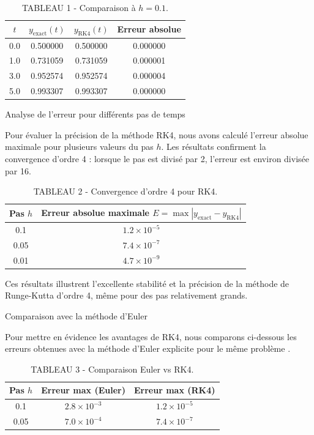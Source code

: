 \documentclass[12pt,a4paper]{article}
\begin{document}
\begin{table}[h]
\centering
\begin{tabular}{cccc}
\toprule
$t$ & $y_{\text{exact}}(t)$ & $y_{\text{RK4}}(t)$ & Erreur absolue \\
\midrule
0.0 & 0.500000 & 0.500000 & 0.000000 \\
1.0 & 0.731059 & 0.731059 & 0.000001 \\
3.0 & 0.952574 & 0.952574 & 0.000004 \\
5.0 & 0.993307 & 0.993307 & 0.000000 \\
\bottomrule
\end{tabular}
\caption{TABLEAU 1 - Comparaison à $h=0.1$.}
\end{table}

\vspace{1em}

Analyse de l’erreur pour différents pas de temps

Pour évaluer la précision de la méthode RK4, nous avons calculé l’erreur absolue maximale pour plusieurs valeurs du pas $h$. Les résultats confirment la convergence d’ordre 4 : lorsque le pas est divisé par 2, l’erreur est environ divisée par 16.

\begin{table}[h]
\centering
\begin{tabular}{cc}
\toprule
Pas $h$ & Erreur absolue maximale $E = \max |y_{\text{exact}} - y_{\text{RK4}}|$ \\
\midrule
0.1 & $1.2 \times 10^{-5}$ \\
0.05 & $7.4 \times 10^{-7}$ \\
0.01 & $4.7 \times 10^{-9}$ \\
\bottomrule
\end{tabular}
\caption{TABLEAU 2 - Convergence d'ordre 4 pour RK4.}
\end{table}

Ces résultats illustrent l’excellente stabilité et la précision de la méthode de Runge-Kutta d’ordre 4, même pour des pas relativement grands.

Comparaison avec la méthode d’Euler

Pour mettre en évidence les avantages de RK4, nous comparons ci-dessous les erreurs obtenues avec la méthode d’Euler explicite pour le même problème \cite{dormand}.

\begin{table}[h]
\centering
\begin{tabular}{ccc}
\toprule
Pas $h$ & Erreur max (Euler) & Erreur max (RK4) \\
\midrule
0.1 & $2.8 \times 10^{-3}$ & $1.2 \times 10^{-5}$ \\
0.05 & $7.0 \times 10^{-4}$ & $7.4 \times 10^{-7}$ \\
\bottomrule
\end{tabular}
\caption{TABLEAU 3 - Comparaison Euler vs RK4.}
\end{table}
\end{document}
